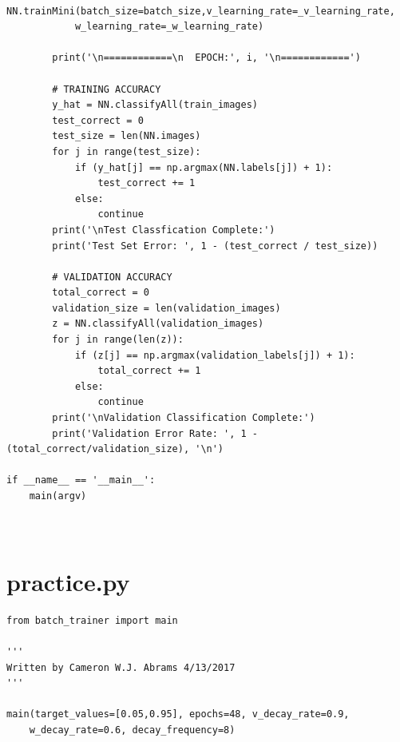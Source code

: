 \documentclass[12pt]{article}
\begin{document}
\begin{verbatim}
		NN.trainMini(batch_size=batch_size,v_learning_rate=_v_learning_rate,
			w_learning_rate=_w_learning_rate)

		print('\n============\n  EPOCH:', i, '\n============')

		# TRAINING ACCURACY
		y_hat = NN.classifyAll(train_images)
		test_correct = 0
		test_size = len(NN.images)
		for j in range(test_size):
			if (y_hat[j] == np.argmax(NN.labels[j]) + 1):
				test_correct += 1
			else:
				continue
		print('\nTest Classfication Complete:')
		print('Test Set Error: ', 1 - (test_correct / test_size))

		# VALIDATION ACCURACY
		total_correct = 0
		validation_size = len(validation_images)
		z = NN.classifyAll(validation_images)
		for j in range(len(z)):
			if (z[j] == np.argmax(validation_labels[j]) + 1):
				total_correct += 1
			else:
				continue
		print('\nValidation Classification Complete:')
		print('Validation Error Rate: ', 1 - (total_correct/validation_size), '\n')

if __name__ == '__main__':
	main(argv)
\end{verbatim}
\section{\\practice.py}
\begin{verbatim}
from batch_trainer import main

'''
Written by Cameron W.J. Abrams 4/13/2017
'''

main(target_values=[0.05,0.95], epochs=48, v_decay_rate=0.9,
	w_decay_rate=0.6, decay_frequency=8)
\end{verbatim}

\newpage
\end{document}
